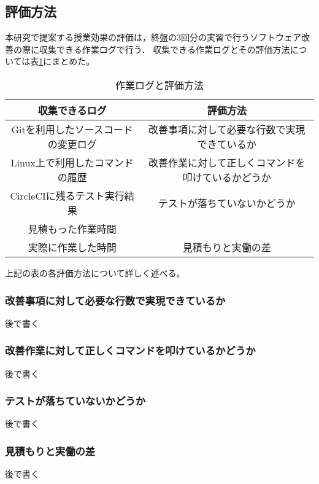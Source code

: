 \subsection{評価方法}

本研究で提案する授業効果の評価は，終盤の3回分の実習で行うソフトウェア改善の際に収集できる作業ログで行う．
収集できる作業ログとその評価方法については表\ref{tab:作業ログと評価方法}にまとめた。

\begin{table}[ht]
  \begin{center}
    \caption{作業ログと評価方法}
    \begin{tabular}{|c|c|}
      \hline
      収集できるログ & 評価方法 \\
      \hline
      Gitを利用したソースコードの変更ログ & 改善事項に対して必要な行数で実現できているか \\
      \hline
      Linux上で利用したコマンドの履歴 & 改善作業に対して正しくコマンドを叩けているかどうか \\
      \hline
      CircleCIに残るテスト実行結果 & テストが落ちていないかどうか \\
      \hline
      見積もった作業時間 & \\
      \cline{1-1}
      実際に作業した時間 & 見積もりと実働の差 \\
      \hline
    \end{tabular}
    \label{tab:作業ログと評価方法}
  \end{center}
\end{table}

上記の表の各評価方法について詳しく述べる。

\subsubsection{改善事項に対して必要な行数で実現できているか}

後で書く

\subsubsection{改善作業に対して正しくコマンドを叩けているかどうか}

後で書く

\subsubsection{テストが落ちていないかどうか}

後で書く

\subsubsection{見積もりと実働の差}

後で書く
